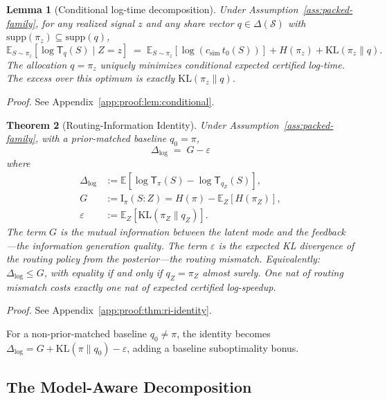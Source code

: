 \documentclass[10pt]{article}
\theoremstyle{paperplain}
\newtheorem{theorem}{Theorem}[section]
\newtheorem{lemma}[theorem]{Lemma}
\theoremstyle{paperdefinition}
\theoremstyle{paperremark}
\newcommand{\KL}{\mathrm{KL}}
\newcommand{\I}{\mathrm{I}}
\newcommand{\E}{\mathbb{E}}
\newcommand{\cS}{\mathcal{S}}
\newcommand{\Dlog}{\Delta_{\log}}
\begin{document}
\begin{lemma}[Conditional log-time decomposition]
\label{lem:conditional}
Under Assumption~\ref{ass:packed-family}, for any realized signal $z$ and any share vector $q \in \Delta(\cS)$ with $\mathrm{supp}(\pi_z) \subseteq \mathrm{supp}(q)$,
\[
\E_{S \sim \pi_z}\!\left[\log \mathsf{T}_q(S) \mid Z=z\right]
\;=\;
\E_{S\sim\pi_z}[\log(c_{\mathrm{sim}}\, t_0(S))] + H(\pi_z) + \KL(\pi_z \| q).
\]
The allocation $q = \pi_z$ uniquely minimizes conditional expected certified log-time.
The excess over this optimum is exactly $\KL(\pi_z \| q)$.
\end{lemma}

\par\noindent\emph{Proof.} See Appendix~\ref{app:proof:lem:conditional}.\par


\begin{theorem}[Routing-Information Identity]
\label{thm:ri-identity}
Under Assumption~\ref{ass:packed-family}, with a prior-matched baseline $q_0 = \pi$,
\[
\boxed{\;
\Dlog \;=\; G - \varepsilon
\;}
\]
where
\begin{align}
\Dlog &:= \E\!\left[\log \mathsf{T}_\pi(S)-\log \mathsf{T}_{q_Z}(S)\right], \nonumber\\
G &:= \I_\pi(S : Z) = H(\pi) - \E_Z[H(\pi_Z)], \label{eq:G-def} \\
\varepsilon &:= \E_Z\!\left[\KL(\pi_Z \| q_Z)\right]. \label{eq:eps-def}
\end{align}
The term $G$ is the mutual information between the latent mode and the feedback---the \emph{information generation quality}.
The term $\varepsilon$ is the expected KL divergence of the routing policy from the posterior---the \emph{routing mismatch}.
Equivalently: $\Dlog \le G$, with equality if and only if $q_Z = \pi_Z$ almost surely.
One nat of routing mismatch costs exactly one nat of expected certified log-speedup.
\end{theorem}

\par\noindent\emph{Proof.} See Appendix~\ref{app:proof:thm:ri-identity}.\par


For a non-prior-matched baseline $q_0 \ne \pi$, the identity becomes $\Dlog = G + \KL(\pi \| q_0) - \varepsilon$, adding a baseline suboptimality bonus.

\subsection{The Model-Aware Decomposition}
\label{subsec:four-term}
\end{document}
